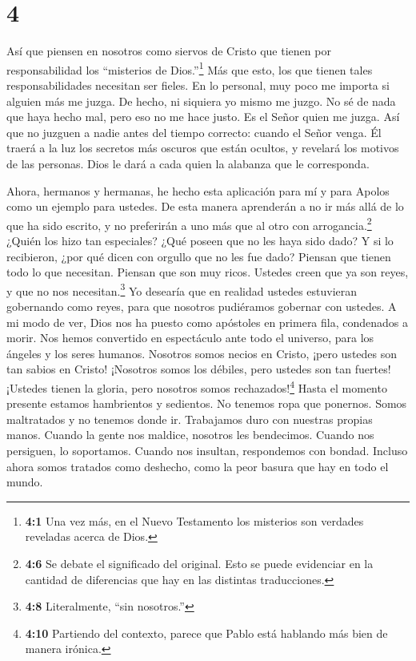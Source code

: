 \hypertarget{section-3}{%
\section{4}\label{section-3}}

 Así que piensen en nosotros como siervos de Cristo que
tienen por responsabilidad los ``misterios de Dios.''\footnote{\textbf{4:1}
  Una vez más, en el Nuevo Testamento los misterios son verdades
  reveladas acerca de Dios.}  Más que esto, los que tienen
tales responsabilidades necesitan ser fieles.  En lo
personal, muy poco me importa si alguien más me juzga. De hecho, ni
siquiera yo mismo me juzgo.  No sé de nada que haya hecho
mal, pero eso no me hace justo. Es el Señor quien me juzga. 
Así que no juzguen a nadie antes del tiempo correcto: cuando el Señor
venga. Él traerá a la luz los secretos más oscuros que están ocultos, y
revelará los motivos de las personas. Dios le dará a cada quien la
alabanza que le corresponda.

 Ahora, hermanos y hermanas, he hecho esta aplicación para
mí y para Apolos como un ejemplo para ustedes. De esta manera aprenderán
a no ir más allá de lo que ha sido escrito, y no preferirán a uno más
que al otro con arrogancia.\footnote{\textbf{4:6} Se debate el
  significado del original. Esto se puede evidenciar en la cantidad de
  diferencias que hay en las distintas traducciones.} 
¿Quién los hizo tan especiales? ¿Qué poseen que no les haya sido dado? Y
si lo recibieron, ¿por qué dicen con orgullo que no les fue dado?
 Piensan que tienen todo lo que necesitan. Piensan que son
muy ricos. Ustedes creen que ya son reyes, y que no nos
necesitan.\footnote{\textbf{4:8} Literalmente, ``sin nosotros.''} Yo
desearía que en realidad ustedes estuvieran gobernando como reyes, para
que nosotros pudiéramos gobernar con ustedes.  A mi modo de
ver, Dios nos ha puesto como apóstoles en primera fila, condenados a
morir. Nos hemos convertido en espectáculo ante todo el universo, para
los ángeles y los seres humanos.  Nosotros somos necios en
Cristo, ¡pero ustedes son tan sabios en Cristo! ¡Nosotros somos los
débiles, pero ustedes son tan fuertes! ¡Ustedes tienen la gloria, pero
nosotros somos rechazados!\footnote{\textbf{4:10} Partiendo del
  contexto, parece que Pablo está hablando más bien de manera irónica.}
 Hasta el momento presente estamos hambrientos y sedientos.
No tenemos ropa que ponernos. Somos maltratados y no tenemos donde ir.
 Trabajamos duro con nuestras propias manos. Cuando la
gente nos maldice, nosotros les bendecimos. Cuando nos persiguen, lo
soportamos.  Cuando nos insultan, respondemos con bondad.
Incluso ahora somos tratados como deshecho, como la peor basura que hay
en todo el mundo.

